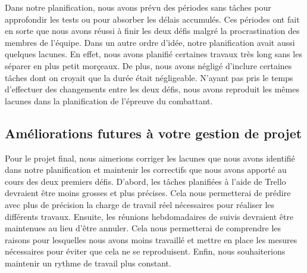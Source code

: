 \begin{spacing}{1.5}
    Dans notre planification, nous avons prévu des périodes sans tâches pour approfondir les tests ou pour absorber les délais accumulés.
    Ces périodes ont fait en sorte que nous avons réussi à finir les deux défis malgré la procrastination des membres de l'équipe.
    Dans un autre ordre d'idée, notre planification avait aussi quelques lacunes. En effet, nous avons planifié certaines travaux très long sans les séparer en plus petit morçeaux.
    De plus, nous avons négligé d'inclure certaines tâches dont on croyait que la durée était négligeable.
    N'ayant pas pris le temps d'effectuer des changements entre les deux défis, nous avons reproduit les mêmes lacunes dans la planification de l'épreuve du combattant.
\end{spacing}

\subsection{Améliorations futures à votre gestion de projet}

\begin{spacing}{1.5}
    Pour le projet final, nous aimerions corriger les lacunes que nous avons identifié dans notre planification et maintenir les correctifs que nous avons apporté au cours des deux premiers défis.
    D'abord, les tâches planifiées à l'aide de Trello devraient être moins grosses et plus précises. Cela nous permetterai de prédire avec plus de précision la charge de travail réel nécessaires pour réaliser les différents travaux.
    Ensuite, les réunions hebdomadaires de suivis devraient être maintenues au lieu d'être annuler. Cela nous permetterai de comprendre les raisons pour lesquelles nous avons moins travaillé et mettre en place les mesures nécessaires pour éviter que cela ne se reproduisent.
    Enfin, nous souhaiterions maintenir un rythme de travail plus constant.
\end{spacing}
